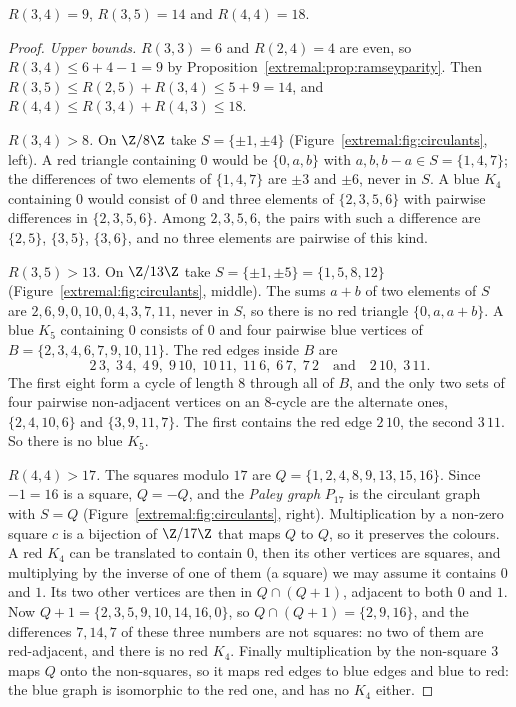 \begin{theorem}\label{extremal:thm:smallramsey}
$R(3,4)=9$, $R(3,5)=14$ and $R(4,4)=18$.
\end{theorem}
\begin{proof}
\emph{Upper bounds.} $R(3,3)=6$ and $R(2,4)=4$ are even, so $R(3,4)\le6+4-1=9$ by Proposition~\ref{extremal:prop:ramseyparity}. Then $R(3,5)\le R(2,5)+R(3,4)\le5+9=14$, and
$R(4,4)\le R(3,4)+R(4,3)\le18$.

\emph{$R(3,4)>8$.} On $\Z/8\Z$ take $S=\{\pm1,\pm4\}$ (Figure~\ref{extremal:fig:circulants}, left). A red triangle containing $0$ would be $\{0,a,b\}$ with $a,b,b-a\in S=\{1,4,7\}$; the
differences of two elements of $\{1,4,7\}$ are $\pm3$ and $\pm6$, never in $S$. A blue $K_4$ containing $0$ would consist of $0$ and three elements of $\{2,3,5,6\}$ with
pairwise differences in $\{2,3,5,6\}$. Among $2,3,5,6$, the pairs with such a difference are $\{2,5\}$, $\{3,5\}$, $\{3,6\}$, and no three elements are pairwise of this kind.

\emph{$R(3,5)>13$.} On $\Z/13\Z$ take $S=\{\pm1,\pm5\}=\{1,5,8,12\}$ (Figure~\ref{extremal:fig:circulants}, middle). The sums $a+b$ of two elements of $S$ are $2,6,9,0,10,0,4,3,7,11$, never in
$S$, so there is no red triangle $\{0,a,a+b\}$. A blue $K_5$ containing $0$ consists of $0$ and four pairwise blue vertices of $B=\{2,3,4,6,7,9,10,11\}$. The red edges
inside $B$ are
\[
2\,3,\;3\,4,\;4\,9,\;9\,10,\;10\,11,\;11\,6,\;6\,7,\;7\,2\quad\text{and}\quad2\,10,\;3\,11.
\]
The first eight form a cycle of length $8$ through all of $B$, and the only two sets of four pairwise non-adjacent vertices on an $8$-cycle are the alternate
ones, $\{2,4,10,6\}$ and $\{3,9,11,7\}$. The first contains the red edge $2\,10$, the second $3\,11$. So there is no blue $K_5$.

\emph{$R(4,4)>17$.} The squares modulo $17$ are $Q=\{1,2,4,8,9,13,15,16\}$. Since $-1=16$ is a square, $Q=-Q$, and the \emph{Paley graph} $P_{17}$ is the circulant graph
with $S=Q$ (Figure~\ref{extremal:fig:circulants}, right). Multiplication by a non-zero square $c$ is a bijection of $\Z/17\Z$ that maps $Q$ to $Q$, so it preserves the colours. A red $K_4$ can be
translated to contain $0$, then its other vertices are squares, and multiplying by the inverse of one of them (a square) we may assume it contains $0$ and $1$. Its
two other vertices are then in $Q\cap(Q+1)$, adjacent to both $0$ and $1$. Now $Q+1=\{2,3,5,9,10,14,16,0\}$, so $Q\cap(Q+1)=\{2,9,16\}$, and the differences $7,14,7$ of these
three numbers are not squares: no two of them are red-adjacent, and there is no red $K_4$. Finally multiplication by the non-square $3$ maps $Q$ onto the non-squares, so it
maps red edges to blue edges and blue to red: the blue graph is isomorphic to the red one, and has no $K_4$ either.
\end{proof}

